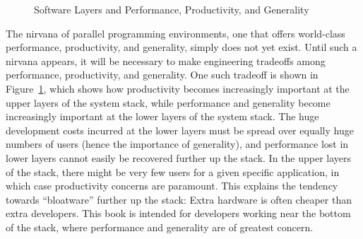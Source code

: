 \begin{figure}[tb]
\centering
{}
\caption{Software Layers and Performance, Productivity, and Generality}
\label{fig:intro:Software Layers and Performance, Productivity, and Generality}
\end{figure}

The nirvana of parallel programming environments, one that offers
world-class performance, productivity, and generality, simply does
not yet exist.
Until such a nirvana appears, it will be necessary to make engineering
tradeoffs among performance, productivity, and generality.
One such tradeoff is shown in
Figure~\ref{fig:intro:Software Layers and Performance, Productivity, and Generality},
which shows how productivity becomes increasingly important at the upper layers
of the system stack,
while performance and generality become increasingly important at the
lower layers of the system stack.
The huge development costs incurred at the lower layers
must be spread over equally huge numbers of users
(hence the importance of generality), and
performance lost in lower layers cannot easily be
recovered further up the stack.
In the upper layers of the stack, there might be very few users for a given
specific application, in which case productivity concerns are paramount.
This explains the tendency towards ``bloatware'' further up the stack:
Extra hardware is often cheaper than extra developers.
This book is intended for developers working near the bottom
of the stack, where performance and generality are of greatest concern.

